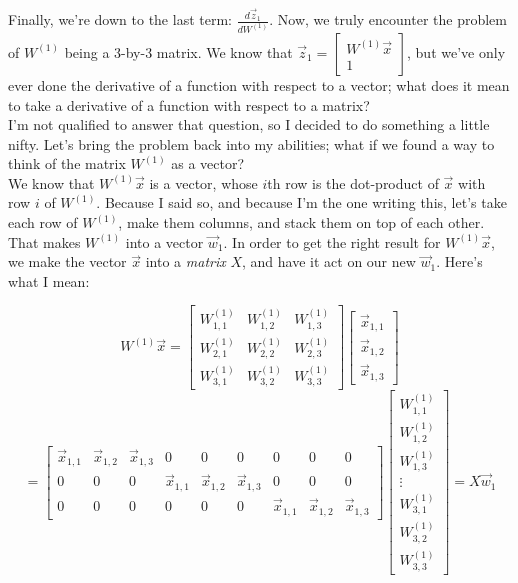 \documentclass{article}
\begin{document}
Finally, we're down to the last term: $\frac{d\vec{z}_1}{d W^{(1)}}$. Now, we truly encounter the problem of $W^{(1)}$ being a 3-by-3 matrix. We know that $\vec{z}_1 = \begin{bmatrix}W^{(1)} \vec{x} \\ 1\end{bmatrix}$, but we've only ever done the derivative of a function with respect to a vector; what does it mean to take a derivative of a function with respect to a matrix? \\

I'm not qualified to answer that question, so I decided to do something a little nifty. Let's bring the problem back into my abilities; what if we found a way to think of the matrix $W^{(1)}$ as a vector? \\

We know that $W^{(1)} \vec{x}$ is a vector, whose $i$th row is the dot-product of $\vec{x}$ with row $i$ of $W^{(1)}$. Because I said so, and because I'm the one writing this, let's take each row of $W^{(1)}$, make them columns, and stack them on top of each other. That makes $W^{(1)}$ into a vector $\vec{w}_1$. In order to get the right result for $W^{(1)} \vec{x}$, we make the vector $\vec{x}$ into a \textit{matrix} $X$, and have it act on our new $\vec{w}_1$. Here's what I mean:

\[W^{(1)} \vec{x} = 
\begin{bmatrix} W^{(1)}_{1, 1} &  W^{(1)}_{1, 2} & W^{(1)}_{1, 3} \\ W^{(1)}_{2, 1} &  W^{(1)}_{2, 2} & W^{(1)}_{2, 3} \\
W^{(1)}_{3, 1} &  W^{(1)}_{3, 2} & W^{(1)}_{3, 3}
\end{bmatrix}
\begin{bmatrix}
\vec{x}_{1,1} \\ \vec{x}_{1,2} \\ \vec{x}_{1,3}
\end{bmatrix}
\]
\[
= \begin{bmatrix}
\vec{x}_{1,1} & \vec{x}_{1,2} & \vec{x}_{1,3} & 0 & 0 & 0 & 0 & 0 & 0\\
  0 & 0 & 0 & \vec{x}_{1,1} & \vec{x}_{1,2} & \vec{x}_{1,3}& 0 & 0 & 0 \\
  0 & 0 & 0 & 0 & 0 & 0 & \vec{x}_{1,1} & \vec{x}_{1,2} & \vec{x}_{1,3}
\end{bmatrix}
\begin{bmatrix} W^{(1)}_{1, 1} \\  W^{(1)}_{1, 2} \\ W^{(1)}_{1, 3} \\ \vdots 
 \\ W^{(1)}_{3, 1}\\ W^{(1)}_{3, 2} \\ W^{(1)}_{3, 3}
\end{bmatrix} = X \vec{w}_1
\]
\end{document}
